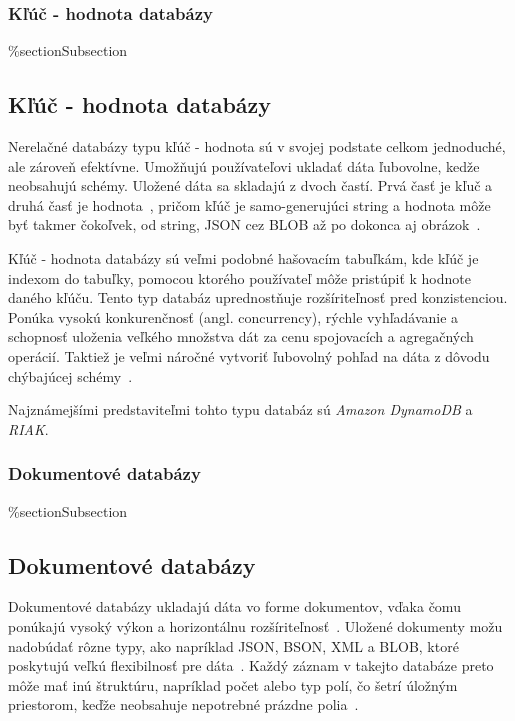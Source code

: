 %
%
{
	\subsubsection{Kľúč - hodnota databázy}
}
{
	\%section{Subsection}
	\subsection{Kľúč - hodnota databázy}
}
\label{subsubsection:key_value_db}
Nerelačné databázy typu kľúč - hodnota sú v svojej podstate celkom jednoduché, ale zároveň efektívne. Umožňujú používateľovi ukladať dáta ľubovolne, kedže neobsahujú schémy. Uložené dáta sa skladajú z dvoch častí. Prvá časť je kľuč a druhá časť je hodnota~\cite{NoSQLDBvsRealtionDB}, pričom kľúč je samo-generujúci string a hodnota môže byť takmer čokoľvek, od string, JSON cez BLOB až po dokonca aj obrázok~\cite{MongoDBvsMySQL2015}.

Kľúč - hodnota databázy sú veľmi podobné hašovacím tabuľkám, kde kľúč je indexom do tabuľky, pomocou ktorého používateľ môže pristúpiť k hodnote daného kľúču. Tento typ databáz uprednostňuje rozšíriteľnosť pred konzistenciou. Ponúka vysokú konkurenčnosť (angl. concurrency), rýchle vyhľadávanie a schopnosť uloženia veľkého množstva dát za cenu spojovacích a agregačných operácií. Taktiež je veľmi náročné vytvoriť ľubovolný pohľad na dáta z dôvodu chýbajúcej schémy~\cite{NoSQLDBvsRealtionDB}.

Najznámejšími predstaviteľmi tohto typu databáz sú \textit{Amazon DynamoDB} a \textit{RIAK}.

%
%
{
	\subsubsection{Dokumentové databázy}
}
{
	\%section{Subsection}
	\subsection{Dokumentové databázy}
}
\label{subsubsection:document_db}
Dokumentové databázy ukladajú dáta vo forme dokumentov, vďaka čomu ponúkajú vysoký výkon a horizontálnu rozšíriteľnosť~\cite{NoSQLDBvsRealtionDB}. Uložené dokumenty možu nadobúdať rôzne typy, ako napríklad JSON, BSON, XML a BLOB, ktoré poskytujú veľkú flexibilnosť pre dáta~\cite{MongoDBvsMySQLCompared}. Každý záznam v takejto databáze preto môže mať inú štruktúru, napríklad počet alebo typ polí, čo šetrí úložným priestorom, keďže neobsahuje nepotrebné prázdne polia~\cite{NoSQLDBvsRealtionDB}.

